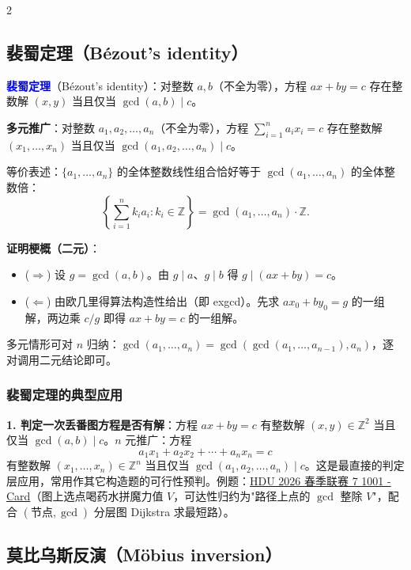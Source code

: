 \begin{multicols*}{2}
		\subsection{裴蜀定理（Bézout's identity）}

		\textcolor{blue}{\textbf{裴蜀定理}}（Bézout's identity）：对整数 $a, b$（不全为零），方程 $a x + b y = c$ 存在整数解 $(x, y)$ 当且仅当 $\gcd(a, b) \mid c$。

		\textbf{多元推广}：对整数 $a_1, a_2, \dots, a_n$（不全为零），方程 $\sum_{i=1}^{n} a_i x_i = c$ 存在整数解 $(x_1, \dots, x_n)$ 当且仅当 $\gcd(a_1, a_2, \dots, a_n) \mid c$。

		等价表述：$\{a_1, \dots, a_n\}$ 的全体整数线性组合恰好等于 $\gcd(a_1, \dots, a_n)$ 的全体整数倍：
		$$\left\{ \sum_{i=1}^{n} k_i a_i : k_i \in \mathbb{Z} \right\} = \gcd(a_1, \dots, a_n) \cdot \mathbb{Z}.$$

		\textbf{证明梗概（二元）}：
		\begin{itemize}
			\item ($\Rightarrow$) 设 $g = \gcd(a, b)$。由 $g \mid a$、$g \mid b$ 得 $g \mid (ax + by) = c$。
			\item ($\Leftarrow$) 由欧几里得算法构造性给出（即 exgcd）。先求 $a x_0 + b y_0 = g$ 的一组解，两边乘 $c / g$ 即得 $a x + b y = c$ 的一组解。
		\end{itemize}

		多元情形可对 $n$ 归纳：$\gcd(a_1, \dots, a_n) = \gcd(\gcd(a_1, \dots, a_{n-1}), a_n)$，逐对调用二元结论即可。

		\subsubsection{裴蜀定理的典型应用}

		\textbf{1. 判定一次丢番图方程是否有解}：方程 $a x + b y = c$ 有整数解 $(x, y) \in \mathbb{Z}^2$ 当且仅当 $\gcd(a, b) \mid c$。$n$ 元推广：方程
		$$a_1 x_1 + a_2 x_2 + \cdots + a_n x_n = c$$
		有整数解 $(x_1, \dots, x_n) \in \mathbb{Z}^n$ 当且仅当 $\gcd(a_1, a_2, \dots, a_n) \mid c$。这是最直接的判定层应用，常用作其它构造题的可行性预判。例题：\href{https://acm.hdu.edu.cn/contest/problem?cid=1203&pid=1001}{HDU 2026 春季联赛 7 1001 - Card}（图上选点喝药水拼魔力值 $V$，可达性归约为"路径上点的 $\gcd$ 整除 $V$"，配合 $(\text{节点}, \gcd)$ 分层图 Dijkstra 求最短路）。

	\end{multicols*}

	\subsection{莫比乌斯反演（Möbius inversion）}

